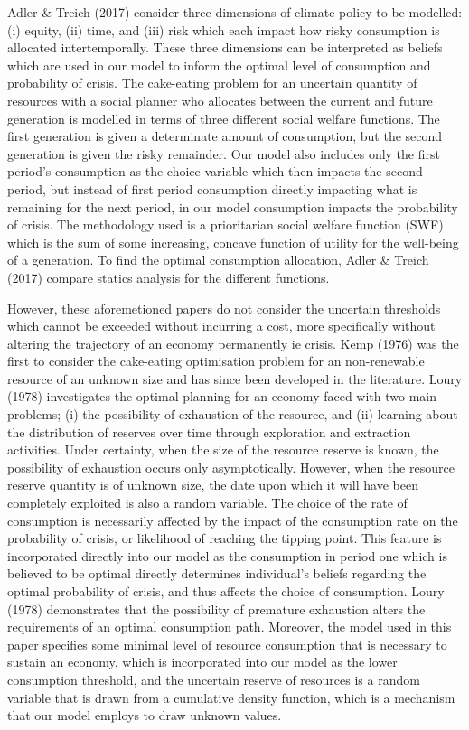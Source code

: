 \documentclass[11pt,preprint, authoryear]{elsarticle}
\numberwithin{equation}{section}
\numberwithin{figure}{section}
\numberwithin{table}{section}
\begin{document}
Adler \& Treich (2017) consider three dimensions of climate policy to be
modelled: (i) equity, (ii) time, and (iii) risk which each impact how
risky consumption is allocated intertemporally. These three dimensions
can be interpreted as beliefs which are used in our model to inform the
optimal level of consumption and probability of crisis. The cake-eating
problem for an uncertain quantity of resources with a social planner who
allocates between the current and future generation is modelled in terms
of three different social welfare functions. The first generation is
given a determinate amount of consumption, but the second generation is
given the risky remainder. Our model also includes only the first
period's consumption as the choice variable which then impacts the
second period, but instead of first period consumption directly
impacting what is remaining for the next period, in our model
consumption impacts the probability of crisis. The methodology used is a
prioritarian social welfare function (SWF) which is the sum of some
increasing, concave function of utility for the well-being of a
generation. To find the optimal consumption allocation, Adler \& Treich
(2017) compare statics analysis for the different functions.

However, these aforemetioned papers do not consider the uncertain
thresholds which cannot be exceeded without incurring a cost, more
specifically without altering the trajectory of an economy permanently
ie crisis. Kemp (1976) was the first to consider the cake-eating
optimisation problem for an non-renewable resource of an unknown size
and has since been developed in the literature. Loury (1978)
investigates the optimal planning for an economy faced with two main
problems; (i) the possibility of exhaustion of the resource, and (ii)
learning about the distribution of reserves over time through
exploration and extraction activities. Under certainty, when the size of
the resource reserve is known, the possibility of exhaustion occurs only
asymptotically. However, when the resource reserve quantity is of
unknown size, the date upon which it will have been completely exploited
is also a random variable. The choice of the rate of consumption is
necessarily affected by the impact of the consumption rate on the
probability of crisis, or likelihood of reaching the tipping point. This
feature is incorporated directly into our model as the consumption in
period one which is believed to be optimal directly determines
individual's beliefs regarding the optimal probability of crisis, and
thus affects the choice of consumption. Loury (1978) demonstrates that
the possibility of premature exhaustion alters the requirements of an
optimal consumption path. Moreover, the model used in this paper
specifies some minimal level of resource consumption that is necessary
to sustain an economy, which is incorporated into our model as the lower
consumption threshold, and the uncertain reserve of resources is a
random variable that is drawn from a cumulative density function, which
is a mechanism that our model employs to draw unknown values.
\end{document}
